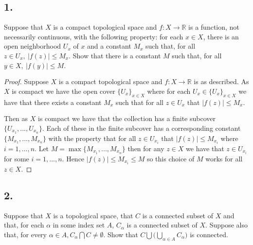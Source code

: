 \documentclass{amsart}
\theoremstyle{plain}
\theoremstyle{definition}
\theoremstyle{remark}
\begin{document}
\noindent
\subsection*{1.} Suppose that $X$ is a compact topological space and $f:X\to \mathbb R$ is a function, not necessarily continuous, with the following property: for each $x\in X$, there is an open neighborhood $U_x$ of $x$ and a constant $M_x$ such that, for all $z\in U_x,\: |f(z)|\leq M_x$. Show that there is a constant $M$ such that, for all $y\in X,\: |f(y)|\leq M$.

\begin{proof}
    Suppose $X$ is a compact topological space and $f: X\to \mathbb R$ is as described. As $X$ is compact we have the open cover $\{U_x\}_{x\in X}$ where for each $U_x\in \{U_x\}_{x\in X}$ we have that there exists a constant $M_x$ such that for all $z\in U_x$ that $|f(z)|\leq M_x$. 
    
    Then as $X$ is compact we have that the collection has a finite subcover $\{U_{x_1},...,U_{x_n}\}$. Each of these in the finite subcover has a corresponding constant $\{M_{x_1},...,M_{x_n}\}$ with the property that for all $z\in U_{x_i}$ that $|f(z)|\leq M_{x_i}$ where $i=1,...,n$. Let $M=\max\{M_{x_1},...,M_{x_n}\}$ then for any $z\in X$ we have that $z\in U_{x_i}$ for some $i=1,...,n$. Hence $|f(z)|\leq M_{x_i}\leq M$ so this choice of $M$ works for all $z\in X$.
\end{proof}

\subsection*{2.}
Suppose that $X$ is a topological space, that $C$ is a connected subset of $X$ and that, for each $\alpha$ in some index set $A$, $C_\alpha$ is a connected subset of $X$. Suppose also that, for every $\alpha \in A, C_\alpha \bigcap C\not = \emptyset$. Show that $C\bigcup\big(\bigcup_{\alpha \in A}C_\alpha \big)$ is connected.
\end{document}
